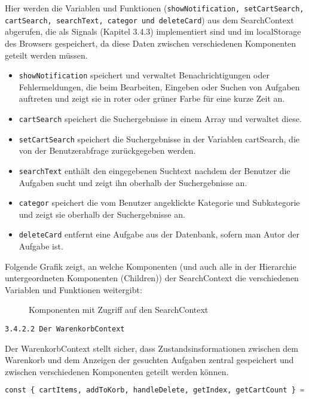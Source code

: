Hier werden die Variablen und Funktionen (\texttt{showNotification, setCartSearch,\\ cartSearch, searchText, categor und deleteCard}) aus dem SearchContext abgerufen, die als Signals (Kapitel 3.4.3) implementiert sind und im localStorage des Browsers gespeichert, da diese Daten zwischen verschiedenen Komponenten geteilt werden müssen.

\begin{itemize}
  \item \texttt{showNotification} speichert und verwaltet Benachrichtigungen oder Fehlermeldungen, die beim Bearbeiten, Eingeben oder Suchen von Aufgaben auftreten und zeigt sie in roter oder grüner Farbe für eine kurze Zeit an.
  \item \texttt{cartSearch} speichert die Suchergebnisse in einem Array und verwaltet diese.
    \item \texttt{setCartSearch} speichert die Suchergebnisse in der Variablen cartSearch, die von der Benutzerabfrage zurückgegeben werden.
    \item \texttt{searchText} enthält den eingegebenen Suchtext nachdem der Benutzer die Aufgaben sucht und zeigt ihn oberhalb der Suchergebnisse an.
    \item \texttt{categor} speichert die vom Benutzer angeklickte Kategorie und Subkategorie und zeigt sie oberhalb der Suchergebnisse an.
    \item \texttt{deleteCard} entfernt eine Aufgabe aus der Datenbank, sofern man Autor der Aufgabe ist.
  
\end{itemize}


Folgende Grafik zeigt, an welche Komponenten (und auch alle in der Hierarchie untergeordneten Komponenten (Children)) der SearchContext die verschiedenen Variablen und Funktionen weitergibt:
\begin{figure}[H]
\caption{Komponenten mit Zugriff auf den SearchContext \cite{fig:all}}
\end{figure}


\texttt{3.4.2.2 Der WarenkorbContext}

Der WarenkorbContext stellt sicher, dass Zustandsinsformationen zwischen dem Warenkorb und dem Anzeigen der gesuchten Aufgaben zentral gespeichert und zwischen verschiedenen Komponenten geteilt werden können.

\begin{lstlisting}[language=Python]
const { cartItems, addToKorb, handleDelete, getIndex, getCartCount } = useContext(WarenkorbContext);
 \end{lstlisting} 


